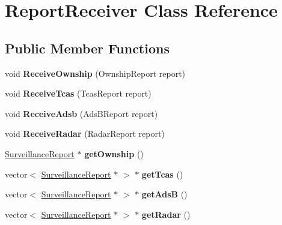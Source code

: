 \hypertarget{class_report_receiver}{}\section{Report\+Receiver Class Reference}
\label{class_report_receiver}
\subsection*{Public Member Functions}
\begin{DoxyCompactItemize}
\item 
\hypertarget{class_report_receiver_ae4dfab4eac7df2be15a29ef457d7a53f}{}void {\bfseries Receive\+Ownship} (Ownship\+Report report)\label{class_report_receiver_ae4dfab4eac7df2be15a29ef457d7a53f}

\item 
\hypertarget{class_report_receiver_ac62fb9a06155bd7f12ecca8997572bc0}{}void {\bfseries Receive\+Tcas} (Tcas\+Report report)\label{class_report_receiver_ac62fb9a06155bd7f12ecca8997572bc0}

\item 
\hypertarget{class_report_receiver_aa7a70c3bccc8c904ec08f6e28f87a4f4}{}void {\bfseries Receive\+Adsb} (Ads\+B\+Report report)\label{class_report_receiver_aa7a70c3bccc8c904ec08f6e28f87a4f4}

\item 
\hypertarget{class_report_receiver_a777d006678383926ef35a029c2a1fe7c}{}void {\bfseries Receive\+Radar} (Radar\+Report report)\label{class_report_receiver_a777d006678383926ef35a029c2a1fe7c}

\item 
\hypertarget{class_report_receiver_afb3f194ab1c9ab1d507f1e1c08a53f02}{}\hyperlink{class_surveillance_report}{Surveillance\+Report} $\ast$ {\bfseries get\+Ownship} ()\label{class_report_receiver_afb3f194ab1c9ab1d507f1e1c08a53f02}

\item 
\hypertarget{class_report_receiver_a6d215102a01d1da9e274846050de984e}{}vector$<$ \hyperlink{class_surveillance_report}{Surveillance\+Report} $\ast$ $>$ $\ast$ {\bfseries get\+Tcas} ()\label{class_report_receiver_a6d215102a01d1da9e274846050de984e}

\item 
\hypertarget{class_report_receiver_a4f68b5991749ff3db85ea696d690b4fe}{}vector$<$ \hyperlink{class_surveillance_report}{Surveillance\+Report} $\ast$ $>$ $\ast$ {\bfseries get\+Ads\+B} ()\label{class_report_receiver_a4f68b5991749ff3db85ea696d690b4fe}

\item 
\hypertarget{class_report_receiver_a67d79cfb6320a13e2d34bc108bffc2cb}{}vector$<$ \hyperlink{class_surveillance_report}{Surveillance\+Report} $\ast$ $>$ $\ast$ {\bfseries get\+Radar} ()\label{class_report_receiver_a67d79cfb6320a13e2d34bc108bffc2cb}

\end{DoxyCompactItemize}
